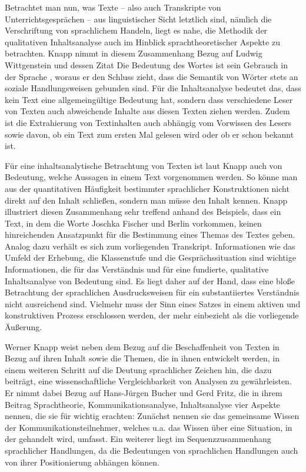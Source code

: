 Betrachtet man nun, was Texte -- also auch Transkripte von Unterrichtsgesprächen -- aus linguistischer Sicht letztlich sind, nämlich die Verschriftung von sprachlichem Handeln, liegt es nahe, die Methodik der qualitativen Inhaltsanalyse auch im Hinblick sprachtheoretischer Aspekte zu betrachten. 
Knapp nimmt in diesem Zusammenhang Bezug auf Ludwig Wittgenstein und dessen Zitat \glqq Die Bedeutung des Wortes ist sein Gebrauch in der Sprache\grqq{} \cite[S.\,21]{LW07}, woraus er den Schluss zieht, dass die Semantik von Wörter stets an soziale Handlungsweisen gebunden sind. 
Für die Inhaltsanalyse bedeutet das, dass kein Text eine allgemeingültige Bedeutung hat, sondern dass verschiedene Leser von Texten auch abweichende Inhalte aus diesen Texten ziehen werden.  
Zudem ist die Extrahierung von Textinhalten auch abhängig vom Vorwissen des Lesers sowie davon, ob ein Text zum ersten Mal gelesen wird oder ob er schon bekannt ist\cite[S.\,22]{WK07}.

Für eine inhaltsanalytische Betrachtung von Texten ist laut Knapp auch von Bedeutung, welche Aussagen in einem Text vorgenommen werden. 
So könne man aus der quantitativen Häufigkeit bestimmter sprachlicher Konstruktionen nicht direkt auf den Inhalt schließen, sondern man müsse den Inhalt kennen. 
Knapp illustriert diesen Zusammenhang sehr treffend anhand des Beispiels, dass ein Text, in dem die Worte \glqq Joschka Fischer\grqq{} und Berlin vorkommen, keinen hinreichenden Ansatzpunkt für die Bestimmung eines Themas des Textes geben. 
Analog dazu verhält es sich zum vorliegenden Transkript. 
Informationen wie das Umfeld der Erhebung, die Klassenstufe und die Gesprächssituation sind wichtige Informationen, die für das Verständnis und für eine fundierte, qualitative Inhaltsanalyse von Bedeutung sind. 
Es liegt daher auf der Hand, dass eine bloße Betrachtung der sprachlichen Ausdrucksweisen für ein substantiiertes Verständnis nicht ausreichend sind. 
Vielmehr muss der Sinn eines Satzes \glqq in einem aktiven und konstruktiven Prozess erschlossen werden, der mehr einbezieht als die vorliegende Äußerung.\grqq{} \cite[S.\,28]{WK07}

Werner Knapp weist neben dem Bezug auf die Beschaffenheit von Texten in Bezug auf ihren Inhalt sowie die Themen, die in ihnen entwickelt werden, in einem weiteren Schritt auf die Deutung sprachlicher Zeichen hin, die dazu beiträgt, eine wissenschaftliche Vergleichbarkeit von Analysen zu gewährleisten. 
Er nimmt dabei Bezug auf Hans-Jürgen Bucher  und Gerd Fritz, die in ihrem Beitrag \glqq Sprachtheorie, Kommunikationsanalyse, Inhaltsanalyse\grqq{} vier Aspekte nennen, die sie für wichtig erachten: 
Zunächst nennen sie das gemeinsame Wissen der Kommunikationsteilnehmer, welches u.a. das Wissen über eine Situation, in der gehandelt wird, umfasst. 
Ein weiterer liegt im Sequenzzusammenhang sprachlicher Handlungen, da die Bedeutungen von sprachlichen Handlungen auch von ihrer Positionierung abhängen können. 

